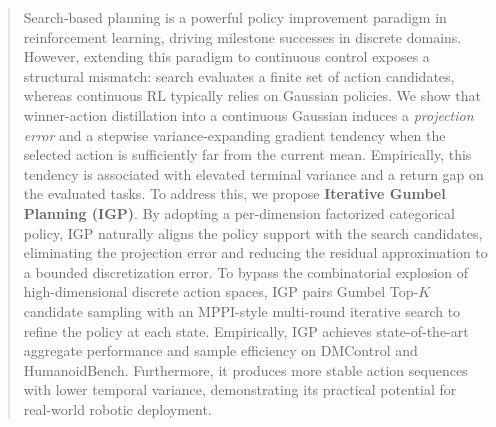\begin{abstract}
Search-based planning is a powerful policy improvement paradigm in reinforcement learning, driving milestone successes in discrete domains. However, extending this paradigm to continuous control exposes a structural mismatch: search evaluates a finite set of action candidates, whereas continuous RL typically relies on Gaussian policies. We show that winner-action distillation into a continuous Gaussian induces a \textit{projection error} and a stepwise variance-expanding gradient tendency when the selected action is sufficiently far from the current mean. Empirically, this tendency is associated with elevated terminal variance and a return gap on the evaluated tasks.
To address this, we propose \textbf{Iterative Gumbel Planning (IGP)}. By adopting a per-dimension factorized categorical policy, IGP naturally aligns the policy support with the search candidates, eliminating the projection error and reducing the residual approximation to a bounded discretization error. To bypass the combinatorial explosion of high-dimensional discrete action spaces, IGP pairs Gumbel Top-$K$ candidate sampling with an MPPI-style multi-round iterative search to refine the policy at each state. Empirically, IGP achieves state-of-the-art aggregate performance and sample efficiency on DMControl and HumanoidBench. Furthermore, it produces more stable action sequences with lower temporal variance, demonstrating its practical potential for real-world robotic deployment.
\end{abstract}
